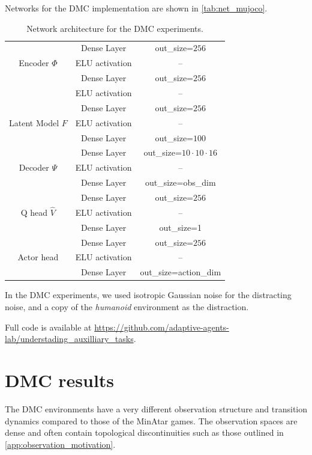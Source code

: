 Networks for the DMC implementation are shown in \autoref{tab:net_mujoco}.

\begin{table}
\begin{center}
\begin{tabular}{c|c|c}
     & Dense Layer & out\_size=$256$ \\
     Encoder $\Phi$ & ELU activation & -- \\
     & Dense Layer & out\_size=$256$\\
     & ELU activation & -- \\\hline
     & Dense Layer & out\_size=$256$ \\
     Latent Model $F$ & ELU activation & -- \\
     & Dense Layer & out\_size=$100$\\\hline
     & Dense Layer & out\_size=$10\cdot10\cdot16$\\
     Decoder $\Psi$ & ELU activation & -- \\
     & Dense Layer & out\_size=obs\_dim\\\hline
     & Dense Layer & out\_size=$256$ \\
     Q head $\hat{V}$ & ELU activation & --\\
     & Dense Layer & out\_size=1\\\hline
     & Dense Layer & out\_size=$256$ \\
     Actor head & ELU activation & --\\
     & Dense Layer & out\_size=action\_dim
\end{tabular}
\end{center}
\caption{Network architecture for the DMC experiments.}
\label{tab:net_mujoco}
\end{table}
In the DMC experiments, we used isotropic Gaussian noise for the distracting noise, and a copy of the \emph{humanoid} environment as the distraction.

Full code is available at \url{https://github.com/adaptive-agents-lab/understading_auxilliary_tasks}.


\section{DMC results}
\label{app:understanding:mujoco_results}

The DMC environments have a very different observation structure and transition dynamics compared to those of the MinAtar games. The observation spaces are dense and often contain topological discontinuities such as those outlined in \autoref{app:observation_motivation}.

